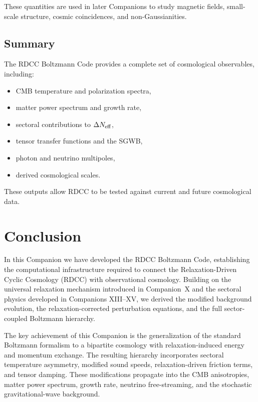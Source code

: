 \documentclass[11pt,a4paper]{article}
\begin{document}
These quantities are used in later Companions to study magnetic fields, small-scale structure,
cosmic coincidences, and non-Gaussianities.

\subsection{Summary}

The RDCC Boltzmann Code provides a complete set of cosmological observables, including:

\begin{itemize}
\item CMB temperature and polarization spectra,
\item matter power spectrum and growth rate,
\item sectoral contributions to $\Delta N_{\rm eff}$,
\item tensor transfer functions and the SGWB,
\item photon and neutrino multipoles,
\item derived cosmological scales.
\end{itemize}

These outputs allow RDCC to be tested against current and future cosmological data.

\section{Conclusion}

In this Companion we have developed the RDCC Boltzmann Code, establishing the computational
infrastructure required to connect the Relaxation-Driven Cyclic Cosmology (RDCC) with observational
cosmology. Building on the universal relaxation mechanism introduced in Companion~X and the
sectoral physics developed in Companions XIII–XV, we derived the modified background evolution,
the relaxation-corrected perturbation equations, and the full sector-coupled Boltzmann hierarchy.

The key achievement of this Companion is the generalization of the standard Boltzmann formalism
to a bipartite cosmology with relaxation-induced energy and momentum exchange. The resulting
hierarchy incorporates sectoral temperature asymmetry, modified sound speeds, relaxation-driven
friction terms, and tensor damping. These modifications propagate into the CMB anisotropies,
matter power spectrum, growth rate, neutrino free-streaming, and the stochastic gravitational-wave
background.
\end{document}

